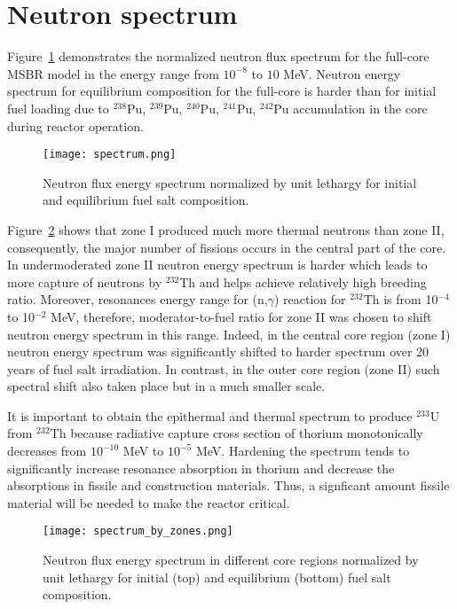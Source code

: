 \section{Neutron spectrum}
Figure~\ref{fig:spectrum} demonstrates the normalized neutron flux spectrum for the full-core \gls{MSBR} model in the energy range from $10^{-8}$ to $10$ MeV. Neutron energy spectrum for equilibrium composition for the full-core is harder than for initial fuel loading due to $^{238}$Pu, $^{239}$Pu, $^{240}$Pu, $^{241}$Pu, $^{242}$Pu accumulation in the core during reactor operation. 

\begin{figure}[htp!] %
  \centering
    \vspace{-0.3em}
  \texttt{[image: spectrum.png]} 
  \caption{Neutron flux energy spectrum normalized by unit lethargy for initial and equilibrium fuel salt composition.}
    \vspace{-0.6em}
  \label{fig:spectrum}
\end{figure}
\FloatBarrier

Figure~\ref{fig:spectrum_zones} shows that zone I produced much more thermal neutrons than zone II, consequently, the major number of fissions occurs in the central part of the core. In undermoderated zone II neutron energy spectrum is harder which leads to more capture of neutrons by $^{232}$Th and helps achieve relatively high breeding ratio. Moreover, resonances energy range for (n,$\gamma$) reaction for $^{232}$Th is from 10$^{-4}$ to 10$^{-2}$ MeV, therefore, moderator-to-fuel ratio for zone II was chosen to shift neutron energy spectrum in this range. Indeed, in the central core region (zone I) neutron energy spectrum was significantly shifted to harder spectrum over 20 years of fuel salt irradiation. In contrast, in the outer core region (zone II) such spectral shift also taken place but in a much smaller scale. 

It is important to obtain the epithermal and thermal spectrum to produce $^{233}$U from $^{232}$Th because radiative capture cross section of thorium monotonically decreases from $10^{-10}$ MeV to $10^{-5}$ MeV. Hardening the spectrum tends to significantly increase resonance absorption in thorium and decrease the absorptions in fissile and construction materials. Thus, a signficant amount fissile material will be needed to make the reactor critical. 

\begin{figure}[htp!] %
  \centering
    \vspace{-0.3em}
  \texttt{[image: spectrum\_by\_zones.png]} 
  \caption{Neutron flux energy spectrum in different core regions normalized by unit lethargy for initial (top) and equilibrium (bottom) fuel salt composition.}
    \vspace{-0.6em}
  \label{fig:spectrum_zones}
\end{figure}
\FloatBarrier

